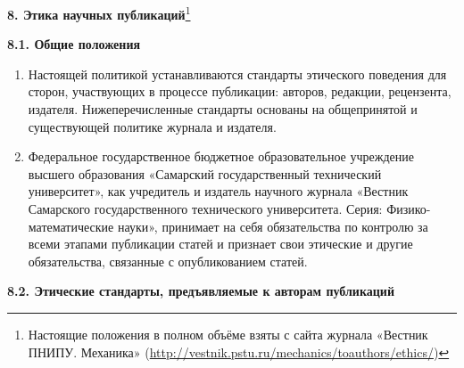 \smallskip

\smallskip



\noindent

{\bf 8. Этика научных публикаций}\footnote{Настоящие положения в полном объёме взяты с сайта журнала «Вестник ПНИПУ. Механика» (\url{http://vestnik.pstu.ru/mechanics/toauthors/ethics/})}



\smallskip



\smallskip



\smallskip



\noindent

{\bf 8.1. Общие положения}



\begin{enumerate}

\item[\bf 1.1.] Настоящей политикой устанавливаются стандарты этического поведения для сторон, участвующих в процессе публикации: авторов, редакции, рецензента, издателя. Нижеперечисленные стандарты основаны на общепринятой и существующей политике журнала и издателя.

\item[\bf 1.2.]  Федеральное государственное бюджетное образовательное учреждение высшего образования «Самарский государственный технический университет», как учредитель и издатель научного журнала «Вестник Самарского государственного технического университета. Серия: Физико-математические науки», принимает на себя обязательства по контролю за всеми этапами публикации статей и признает свои этические и другие обязательства, связанные с опубликованием статей.

\end{enumerate}





\smallskip



\noindent

{\bf 8.2. Этические стандарты, предъявляемые к авторам публикаций}





